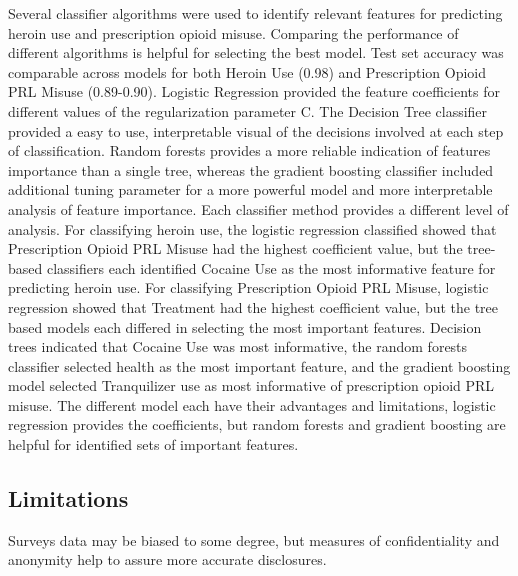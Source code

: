 \documentclass[sigconf]{acmart}
\begin{document}
Several classifier algorithms were used to identify relevant features for 
predicting heroin use and prescription opioid misuse. Comparing the performance 
of different algorithms is helpful for  selecting the best model. Test set
accuracy was comparable across models for both Heroin Use (0.98) and 
Prescription Opioid PRL Misuse (0.89-0.90). Logistic Regression provided the
feature coefficients for different values of the regularization parameter C. 
The Decision Tree classifier provided a easy to use, interpretable visual of
the decisions involved at each step of classification. Random forests provides
a more reliable indication of features importance than a single tree, 
whereas the gradient boosting classifier included additional tuning 
parameter for a more powerful model and more interpretable analysis of
feature importance. Each classifier method provides a different level of
analysis. For classifying heroin use, the logistic regression classified
showed that Prescription Opioid PRL Misuse had the highest coefficient value, 
but the tree-based classifiers each identified Cocaine Use as the most
informative feature for predicting heroin use. For classifying Prescription 
Opioid PRL Misuse, logistic regression showed that Treatment had the highest
coefficient value, but the tree based models each differed in selecting the
most important features. Decision trees indicated that Cocaine Use was most
informative, the random forests classifier selected health as the most
important feature, and the gradient boosting model selected Tranquilizer use
as most informative of prescription opioid PRL misuse. The different model 
each have their advantages and limitations, logistic regression provides the
coefficients, but random forests and gradient boosting are helpful for 
identified sets of important features.

\subsection{Limitations}

Surveys data may be biased to some degree, but measures of confidentiality and 
anonymity help to assure more accurate disclosures. 
\end{document}
